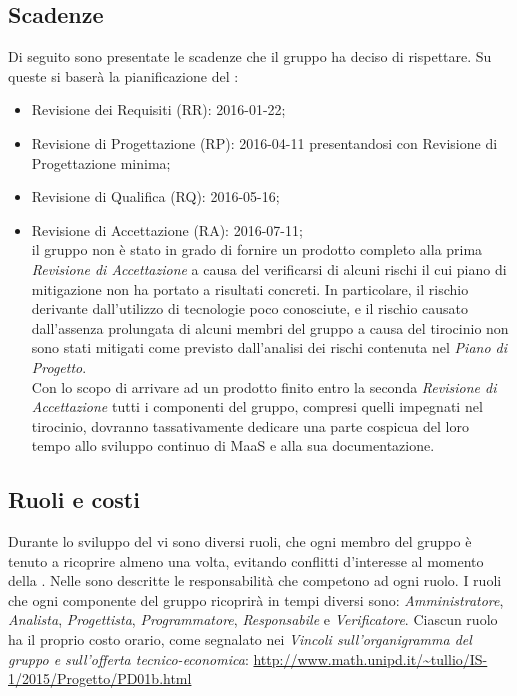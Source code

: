 \subsection{Scadenze}
Di seguito sono presentate le scadenze che il gruppo ha deciso di rispettare. Su queste si baserà la pianificazione del :
\begin{itemize}
\item Revisione dei Requisiti (RR): 2016-01-22;
\item Revisione di Progettazione (RP): 2016-04-11 presentandosi con Revisione di Progettazione minima; 
\item Revisione di Qualifica (RQ): 2016-05-16;
\item Revisione di Accettazione (RA): 2016-07-11; \\il gruppo non è stato in grado di fornire un prodotto completo
alla prima \textit{Revisione di Accettazione} a causa del verificarsi di alcuni rischi il cui piano di mitigazione
non ha portato a risultati concreti.
In particolare, il rischio derivante dall'utilizzo di tecnologie poco conosciute, e il rischio causato dall'assenza
prolungata di alcuni membri del gruppo a causa del tirocinio non sono stati mitigati come previsto dall'analisi dei rischi
contenuta nel \textit{Piano di Progetto}. \\
Con lo scopo di arrivare ad un prodotto finito entro la seconda \textit{Revisione di Accettazione} tutti i componenti del gruppo,
compresi quelli impegnati nel tirocinio, dovranno tassativamente dedicare una parte cospicua del loro tempo allo sviluppo
continuo di MaaS e alla sua documentazione.
\end{itemize}

\subsection{Ruoli e costi}
Durante lo sviluppo del  vi sono diversi ruoli, che ogni membro del gruppo è tenuto a ricoprire almeno una volta, evitando conflitti d’interesse al momento della . Nelle \NormeDiProgetto sono descritte le responsabilità che competono ad ogni ruolo. I ruoli che ogni componente del gruppo ricoprirà in tempi diversi sono: \textit{Amministratore}, \textit{Analista}, \textit{Progettista}, \textit{Programmatore}, \textit{Responsabile} e \textit{Verificatore}.
Ciascun ruolo ha il proprio costo orario, come segnalato nei \textit{Vincoli sull’organigramma del gruppo e sull’offerta tecnico-economica}:
\url{http://www.math.unipd.it/~tullio/IS-1/2015/Progetto/PD01b.html}




